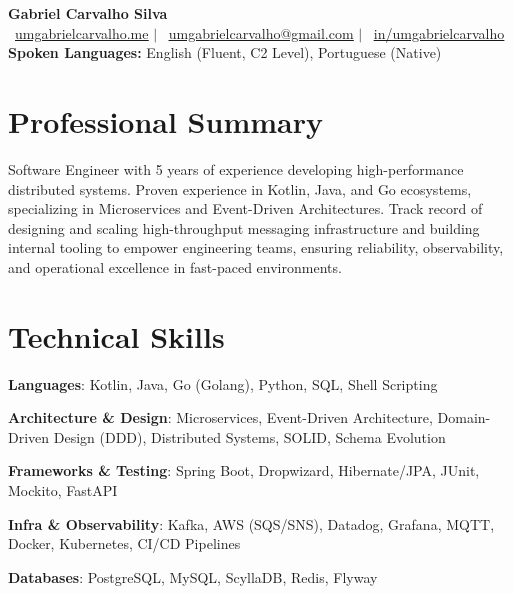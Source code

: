 \documentclass[letterpaper,11pt]{article}
\begin{document}
\begin{center}
    {\Huge \textbf{Gabriel Carvalho Silva}} \\ \vspace{6pt}
    \small
    \faGlobe\ \href{https://umgabrielcarvalho.me}{\underline{umgabrielcarvalho.me}} $|$ 
    \faEnvelope\ \href{mailto:umgabrielcarvalho@gmail.com}{\underline{umgabrielcarvalho@gmail.com}} $|$ 
    \faLinkedin\ \href{https://linkedin.com/in/umgabrielcarvalho}{\underline{in/umgabrielcarvalho}} \\ \vspace{4pt}
    \textbf{Spoken Languages:} English (Fluent, C2 Level), Portuguese (Native)
\end{center}

\section{Professional Summary}
\vspace{4pt}
\small{Software Engineer with 5 years of experience developing high-performance distributed systems. Proven experience in Kotlin, Java, and Go ecosystems, specializing in Microservices and Event-Driven Architectures. Track record of designing and scaling high-throughput messaging infrastructure and building internal tooling to empower engineering teams, ensuring reliability, observability, and operational excellence in fast-paced environments.}

\section{Technical Skills}
\vspace{2pt}
\begin{itemize}[leftmargin=0.15in, label={}]
    \small{\item \textbf{Languages}{: Kotlin, Java, Go (Golang), Python, SQL, Shell Scripting}}
    \small{\item \textbf{Architecture \& Design}{: Microservices, Event-Driven Architecture, Domain-Driven Design (DDD), Distributed Systems, SOLID, Schema Evolution}}
    \small{\item \textbf{Frameworks \& Testing}{: Spring Boot, Dropwizard, Hibernate/JPA, JUnit, Mockito, FastAPI}}
    \small{\item \textbf{Infra \& Observability}{: Kafka, AWS (SQS/SNS), Datadog, Grafana, MQTT, Docker, Kubernetes, CI/CD Pipelines}}
    \small{\item \textbf{Databases}{: PostgreSQL, MySQL, ScyllaDB, Redis, Flyway}}
\end{itemize}
\end{document}
